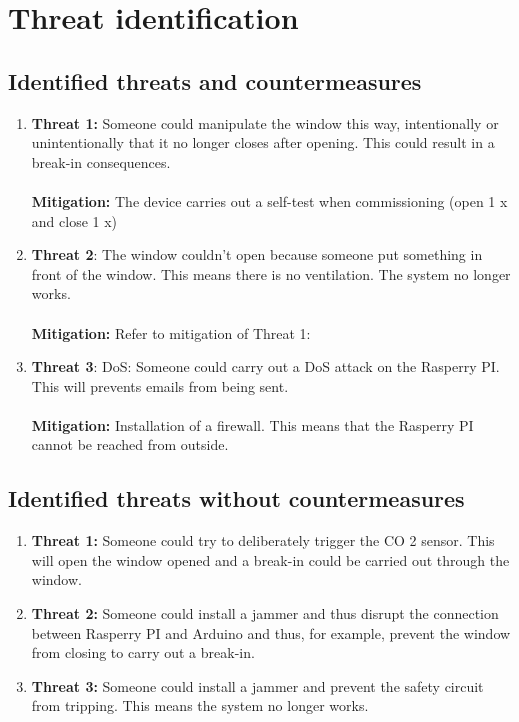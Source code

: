 \section{Threat identification}
\label{chapter3}

\subsection{Identified threats and countermeasures}

	\begin{enumerate}
		\item  \textbf{Threat 1:}
            Someone could manipulate the window this way, intentionally or unintentionally
            that it no longer closes after opening. This could result in a break-in
            consequences. \\ \\         
             \textbf{Mitigation:}
            The device carries out a self-test when commissioning (open 1 x and close 1 x)
		\item \textbf{Threat 2}:
            The window couldn't open because someone put something in front of the window.
            This means there is no ventilation. The system no longer works.\\ \\
            \textbf{Mitigation:}
            Refer to mitigation of Threat 1:
		\item \textbf{Threat 3}:
            DoS: Someone could carry out a DoS attack on the Rasperry PI. This will
            prevents emails from being sent.\\ \\
            \textbf{Mitigation:}
            Installation of a firewall. This means that the Rasperry PI cannot be reached from outside.
	\end{enumerate}
	
\subsection{Identified threats without countermeasures}

	\begin{enumerate}
		\item \textbf{Threat 1:} 
            Someone could try to deliberately trigger the CO 2 sensor. This will open the window
            opened and a break-in could be carried out through the window.  
		\item \textbf{Threat 2:}
            Someone could install a jammer and thus disrupt the connection between Rasperry PI and Arduino and thus, for example, prevent the window from closing
            to carry out a break-in.
		\item \textbf{Threat 3:}
            Someone could install a jammer and prevent the safety circuit from tripping. This means the system no longer works.            
	\end{enumerate}